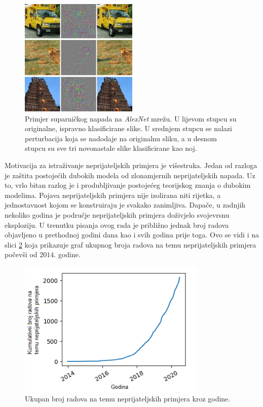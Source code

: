\documentclass[utf8, diplomski]{fer}
\begin{document}
\begin{figure}[H]
\centering
\includegraphics[width=0.5\textwidth,keepaspectratio]{img/other/alexnet_adv.jpg}
\caption{Primjer suparničkog napada na \textit{AlexNet} mrežu\citep{Szegedy2014IntriguingPO}. U lijevom stupcu su originalne, ispravno klasificirane slike. U srednjem stupcu se nalazi perturbacija koja se nadodaje na originalnu sliku, a u desnom stupcu su sve tri novonastale slike klasificirane kao noj.}
\label{fig:alexnet_adv}
\end{figure}

\par
Motivacija za istraživanje neprijateljskih primjera je višestruka. Jedan od razloga je zaštita postojećih dubokih modela od zlonamjernih neprijateljskih napada. Uz to, vrlo bitan razlog je i produbljivanje postojećeg teorijskog znanja o dubokim modelima. Pojava neprijateljskih primjera nije izolirana niti rijetka, a jednostavnost kojom se konstruiraju je svakako zanimljiva. Dapače, u zadnjih nekoliko godina je područje neprijateljskih primjera doživjelo svojevrsnu eksploziju. U trenutku pisanja ovog rada je približno jednak broj radova objavljeno u prethodnoj godini dana kao i svih godina prije toga. Ovo se vidi i na slici \ref{fig:cumsum_adv} koja prikazuje graf ukupnog broja radova na temu neprijateljskih primjera počevši od $2014.$ godine.

\begin{figure}[H]
\centering
\includegraphics[width=0.8\textwidth,keepaspectratio]{img/other/cumsum.png}
\caption{Ukupan broj radova na temu neprijateljskih primjera kroz godine.\citep{carlini_webpage}}
\label{fig:cumsum_adv}
\end{figure}
\end{document}
